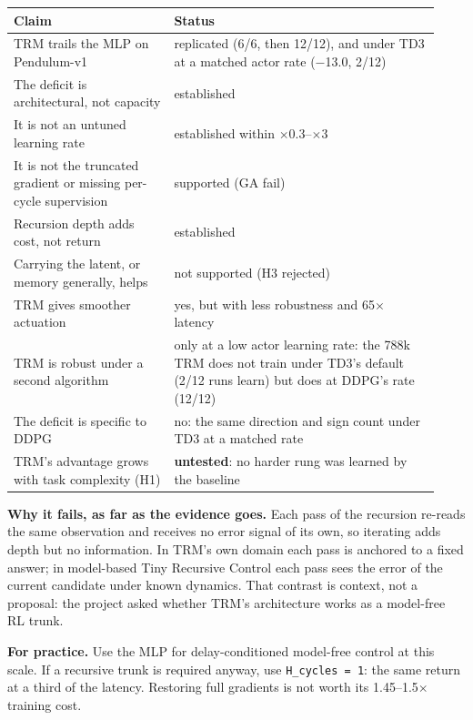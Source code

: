 \documentclass[11pt]{article}
\begin{document}
\begin{center}\small\begin{tabular}{>{\raggedright\arraybackslash}p{0.350\linewidth}>{\raggedright\arraybackslash}p{0.584\linewidth}}
\toprule
Claim & Status \\
\midrule
TRM trails the MLP on Pendulum-v1 & replicated (6/6, then 12/12), and under TD3 at a matched actor rate ($-$13.0, 2/12) \\
The deficit is architectural, not capacity & established \\
It is not an untuned learning rate & established within $\times$0.3--$\times$3 \\
It is not the truncated gradient or missing per-cycle supervision & supported (GA fail) \\
Recursion depth adds cost, not return & established \\
Carrying the latent, or memory generally, helps & not supported (H3 rejected) \\
TRM gives smoother actuation & yes, but with less robustness and 65$\times$ latency \\
TRM is robust under a second algorithm & only at a low actor learning rate: the 788k TRM does not train under TD3's default (2/12 runs learn) but does at DDPG's rate (12/12) \\
The deficit is specific to DDPG & no: the same direction and sign count under TD3 at a matched rate \\
TRM's advantage grows with task complexity (H1) & \textbf{untested}: no harder rung was learned by the baseline \\
\bottomrule
\end{tabular}\end{center}



\textbf{Why it fails, as far as the evidence goes.} Each pass of the recursion re-reads the same observation and receives no error signal of its own, so iterating adds depth but no information. In TRM's own domain each pass is anchored to a fixed answer; in model-based Tiny Recursive Control each pass sees the error of the current candidate under known dynamics. That contrast is context, not a proposal: the project asked whether TRM's architecture works as a model-free RL trunk.



\textbf{For practice.} Use the MLP for delay-conditioned model-free control at this scale. If a recursive trunk is required anyway, use \texttt{H\_cycles = 1}: the same return at a third of the latency. Restoring full gradients is not worth its 1.45--1.5$\times$ training cost.
\end{document}
